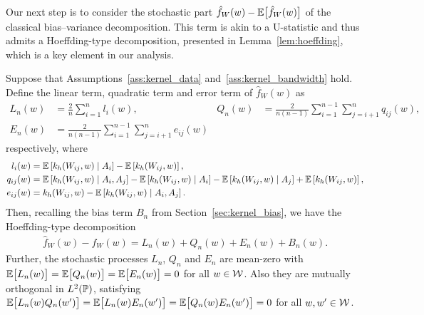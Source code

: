 Our next step is to consider the stochastic part
$\hat f_W(w) - \E \big[ \hat f_W(w) \big]$
of the classical bias--variance decomposition. This term is akin to a
U-statistic and thus admits a Hoeffding-type decomposition, presented in
Lemma~\ref{lem:hoeffding}, which is a key element in our analysis.

\begin{lemma}
  \label{lem:hoeffding}

  Suppose that Assumptions~\ref{ass:kernel_data} and~\ref{ass:kernel_bandwidth}
  hold. Define the linear term, quadratic term and error term of
  $\hat f_W(w)$ as
  \begin{align*}
    L_n(w)
    &=
    \frac{2}{n} \sum_{i=1}^n l_i(w),
    &Q_n(w) &= \frac{2}{n(n-1)} \sum_{i=1}^{n-1} \sum_{j=i+1}^{n} q_{i j}(w), \\
    E_n(w) &= \frac{2}{n(n-1)} \sum_{i=1}^{n-1} \sum_{j=i+1}^{n} e_{i j}(w)
  \end{align*}
  respectively, where
  \begin{align*}
    l_i(w)
    &=
    \E\left[k_h(W_{i j},w) \mid A_i\right] - \E\left[k_h(W_{i j},w)\right], \\
    q_{i j}(w)
    &=
    \E\left[k_h(W_{i j},w) \mid A_i, A_j\right]
    - \E\left[k_h(W_{i j},w) \mid A_i\right]
    - \E\left[k_h(W_{i j},w) \mid A_j\right]
    + \E\left[k_h(W_{i j},w)\right], \\
    e_{i j}(w)
    &=
    k_h(W_{i j},w) - \E\left[k_h(W_{i j},w) \mid A_i, A_j\right].
  \end{align*}
  Then, recalling the bias term $B_n$ from Section~\ref{sec:kernel_bias},
  we have the Hoeffding-type decomposition
  \begin{align}
    \label{eq:h-decomposition}
    \hat f_W(w) - f_W(w) = L_n(w) + Q_n(w) + E_n(w) + B_n(w).
  \end{align}
  Further, the stochastic processes $L_n$, $Q_n$ and $E_n$ are mean-zero
  with $\E\big[L_n(w)\big] = \E\big[Q_n(w)\big] = \E\big[E_n(w)\big] = 0$
  for all $w \in \cW$. Also they are mutually orthogonal in $L^2(\P)$,
  satisfying $\E\big[ L_n(w) Q_n(w') \big] = \E\big[ L_n(w) E_n(w') \big]
  = \E\big[ Q_n(w) E_n(w') \big] = 0$ for all $w, w' \in \cW$.
\end{lemma}

